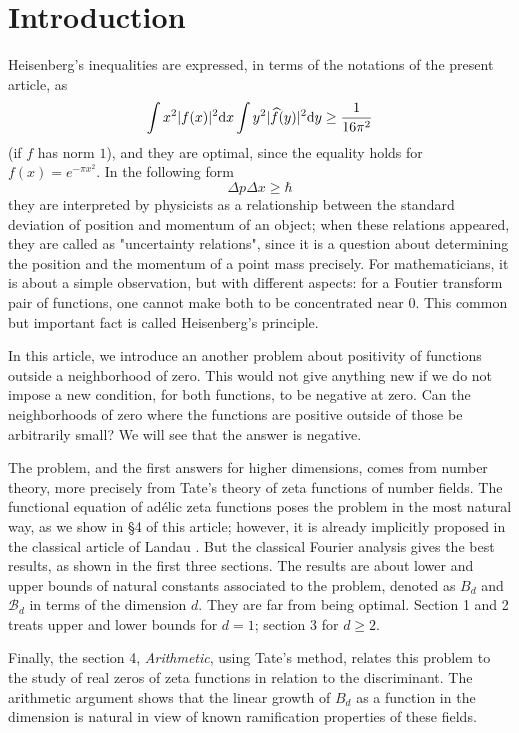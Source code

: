 \section*{Introduction}


Heisenberg's inequalities are expressed, in terms of the notations of the present article, as
\[
    \int x^2 |f(x)|^2 \mathrm{d} x \int y^2 |\widehat{f}(y)|^2 \mathrm{d} y \geq \frac{1}{16 \pi^2}
\]
(if $f$ has norm $1$), and they are optimal, since the equality holds for $f(x) = e^{-\pi x^2}$.
In the following form
\[
    \Delta p \Delta x \geq \hbar
\]
they are interpreted by physicists as a relationship between the standard deviation of position and momentum of an object; when these relations appeared, they are called as "uncertainty relations", since it is a question about determining the position and the momentum of a point mass precisely.
For mathematicians, it is about a simple observation, but with different aspects: for a Foutier transform pair of functions, one cannot make both to be concentrated near $0$.
This common but important fact is called Heisenberg's principle.

In this article, we introduce an another problem about positivity of functions outside a neighborhood of zero.
This would not give anything new if we do not impose a new condition, for both functions, to be negative at zero.
Can the neighborhoods of zero where the functions are positive outside of those be arbitrarily small?
We will see that the answer is negative.

The problem, and the first answers for higher dimensions, comes from number theory, more precisely from Tate's theory of zeta functions of number fields.
The functional equation of ad\'elic zeta functions poses the problem in the most natural way, as we show in \S 4 of this article; however, it is already implicitly proposed in the classical article of Landau \cite{landau1918uber}.
But the classical Fourier analysis gives the best results, as shown in the first three sections.
The results are about lower and upper bounds of natural constants associated to the problem, denoted as $B_d$ and $\mathcal{B}_d$ in terms of the dimension $d$.
They are far from being optimal.
Section 1 and 2 treats upper and lower bounds for $d = 1$; section 3 for $d \geq 2$.

Finally, the section 4, \emph{Arithmetic}, using Tate's method, relates this problem to the study of real zeros of zeta functions in relation to the discriminant.
The arithmetic argument shows that the linear growth of $B_d$ as a function in the dimension is natural in view of known ramification properties of these fields.
